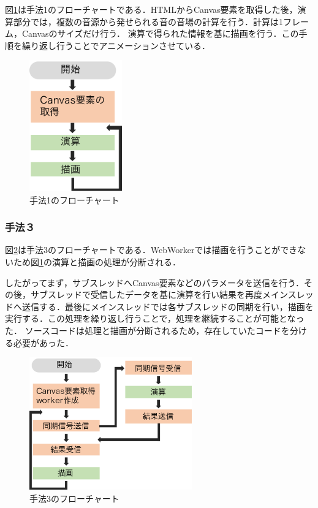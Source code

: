 \documentclass[a4j,12pt]{jsarticle}
\begin{document}
図\ref{fig:cpu}は手法1のフローチャートである．HTMLからCanvas要素を取得した後，演算部分では，複数の音源から発せられる音の音場の計算を行う．計算は1フレーム，Canvasのサイズだけ行う．
演算で得られた情報を基に描画を行う．この手順を繰り返し行うことでアニメーションさせている．
\begin{figure}[H]
 \begin{center}
  \includegraphics[width=40mm]{cpu_chart.pdf}
 \end{center}
 \caption{手法1のフローチャート}
 \label{fig:cpu}
\end{figure}

\subsubsection{手法３}
図\ref{fig:worker}は手法3のフローチャートである．WebWorkerでは描画を行うことができないため図\ref{fig:cpu}の演算と描画の処理が分断される．

したがってまず，サブスレッドへCanvas要素などのパラメータを送信を行う．その後，サブスレッドで受信したデータを基に演算を行い結果を再度メインスレッドへ送信する．最後にメインスレッドでは各サブスレッドの同期を行い，描画を実行する．この処理を繰り返し行うことで，処理を継続することが可能となった．
ソースコードは処理と描画が分断されるため，存在していたコードを分ける必要があった．

\begin{figure}[H]
 \begin{center}
  \includegraphics[width=70mm]{worker_chart2.pdf}
 \end{center}
 \caption{手法3のフローチャート}
 \label{fig:worker}
\end{figure}
\end{document}
